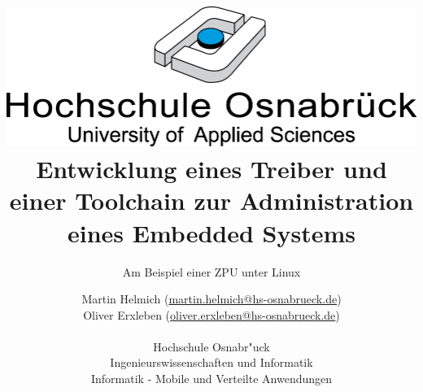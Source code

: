 \documentclass[12pt]{scrartcl}
\begin{document}
\author{%
	Martin Helmich \small(\href{mailto:martin.helmich@hs-osnabrueck.de}{martin.helmich@hs-osnabrueck.de})\\%
	Oliver Erxleben \small(\href{mailto:oliver.erxleben@hs-osnabrueck.de}{oliver.erxleben@hs-osnabrueck.de})\\ \\%
	Hochschule Osnabr"uck \\%
	Ingenieurswissenschaften und Informatik \\%
	Informatik - Mobile und Verteilte Anwendungen }

\title{\includegraphics[scale=0.75,keepaspectratio]{img/hs_os.png}\linebreak \linebreak Entwicklung eines Treiber und einer Toolchain zur Administration eines Embedded Systems}
\subtitle{Am Beispiel einer ZPU unter Linux}

\maketitle
\thispagestyle{empty}
\tableofcontents

\listoffigures

\lstlistoflistings
\end{document}
